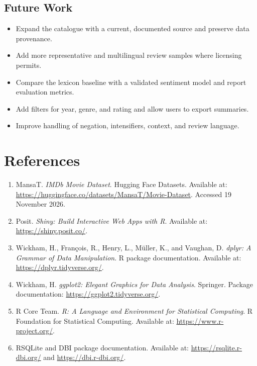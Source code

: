 \documentclass[12pt,a4paper]{report}
\begin{document}
\section*{Future Work}
\begin{itemize}
  \item Expand the catalogue with a current, documented source and preserve data provenance.
  \item Add more representative and multilingual review samples where licensing permits.
  \item Compare the lexicon baseline with a validated sentiment model and report evaluation metrics.
  \item Add filters for year, genre, and rating and allow users to export summaries.
  \item Improve handling of negation, intensifiers, context, and review language.
\end{itemize}

\chapter{References}
\begin{enumerate}
  \item MansaT. \textit{IMDb Movie Dataset}. Hugging Face Datasets. Available at: \url{https://huggingface.co/datasets/MansaT/Movie-Dataset}. Accessed 19 November 2026.
  \item Posit. \textit{Shiny: Build Interactive Web Apps with R}. Available at: \url{https://shiny.posit.co/}.
  \item Wickham, H., François, R., Henry, L., Müller, K., and Vaughan, D. \textit{dplyr: A Grammar of Data Manipulation}. R package documentation. Available at: \url{https://dplyr.tidyverse.org/}.
  \item Wickham, H. \textit{ggplot2: Elegant Graphics for Data Analysis}. Springer. Package documentation: \url{https://ggplot2.tidyverse.org/}.
  \item R Core Team. \textit{R: A Language and Environment for Statistical Computing}. R Foundation for Statistical Computing. Available at: \url{https://www.r-project.org/}.
  \item RSQLite and DBI package documentation. Available at: \url{https://rsqlite.r-dbi.org/} and \url{https://dbi.r-dbi.org/}.
\end{enumerate}
\end{document}
